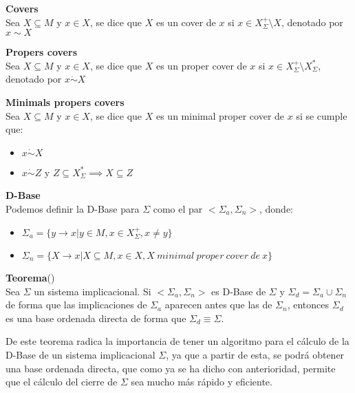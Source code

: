 \textbf{Covers}\\
Sea \(X \subseteq M\) y \(x \in X\), se dice que \(X\) es un cover de \(x\) si \(x \in X^+_{\Sigma} \setminus X\), denotado por \(x \sim X\)

\textbf{Propers covers} \\
Sea \(X \subseteq M\) y \(x \in X\), se dice que \(X\) es un proper cover de \(x\) si \(x \in X^+_{\Sigma} \setminus X^*_{\Sigma}\), denotado por \(x \dot\sim X\)

\textbf{Minimals propers covers}\\
Sea \(X \subseteq M\) y \(x \in X\), se dice que \(X\) es un minimal proper cover de \(x\) si se cumple que:
\begin{itemize}
    \item \(x \dot\sim X\)
    \item \(x \dot\sim Z\) y \(Z \subseteq X^*_{\Sigma} \implies X \subseteq Z\)
\end{itemize}

\textbf{D-Base}\\
Podemos definir la D-Base para \(\Sigma\) como el par \(<\Sigma_a, \Sigma_n>\), donde:

\begin{itemize}
    \item \(\Sigma_a = \{y \to x | y \in M, x \in X^+_{\Sigma}, x \neq y \} \)
    \item \(\Sigma_n = \{X \to x | X \subseteq M, x \in X, X \ minimal \ proper \ cover \ de \ x\} \)

\end{itemize}

\textbf{Teorema}(\cite{Adaricheva})\\
Sea \(\Sigma\) un sistema implicacional. Si \(<\Sigma_a, \Sigma_n>\) es D-Base de \(\Sigma\) y \(\Sigma_d = \Sigma_a\cup \Sigma_n\) de forma que las implicaciones de \(\Sigma_a\) aparecen antes que las de \(\Sigma_n\), entonces \(\Sigma_d\) es una base ordenada directa de forma que \(\Sigma_d \equiv \Sigma\).

De este teorema radica la importancia de tener un algoritmo para el c\'alculo de la D-Base de un sistema implicacional \(\Sigma\), ya que a partir de esta, se podr\'a obtener una base ordenada directa, que como ya se ha dicho con anterioridad, permite que el c\'alculo del cierre de \(\Sigma\) sea mucho m\'as r\'apido y eficiente.\\


